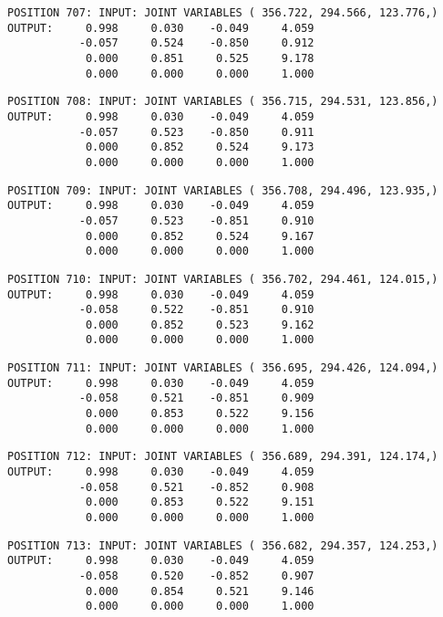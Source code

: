 \begin{verbatim}
POSITION 707: INPUT: JOINT VARIABLES ( 356.722, 294.566, 123.776,)
OUTPUT:     0.998     0.030    -0.049     4.059
           -0.057     0.524    -0.850     0.912
            0.000     0.851     0.525     9.178
            0.000     0.000     0.000     1.000
\end{verbatim} \pagebreak[1]\begin{verbatim}
POSITION 708: INPUT: JOINT VARIABLES ( 356.715, 294.531, 123.856,)
OUTPUT:     0.998     0.030    -0.049     4.059
           -0.057     0.523    -0.850     0.911
            0.000     0.852     0.524     9.173
            0.000     0.000     0.000     1.000
\end{verbatim} \pagebreak[1]\begin{verbatim}
POSITION 709: INPUT: JOINT VARIABLES ( 356.708, 294.496, 123.935,)
OUTPUT:     0.998     0.030    -0.049     4.059
           -0.057     0.523    -0.851     0.910
            0.000     0.852     0.524     9.167
            0.000     0.000     0.000     1.000
\end{verbatim} \pagebreak[1]\begin{verbatim}
POSITION 710: INPUT: JOINT VARIABLES ( 356.702, 294.461, 124.015,)
OUTPUT:     0.998     0.030    -0.049     4.059
           -0.058     0.522    -0.851     0.910
            0.000     0.852     0.523     9.162
            0.000     0.000     0.000     1.000
\end{verbatim} \pagebreak[1]\begin{verbatim}
POSITION 711: INPUT: JOINT VARIABLES ( 356.695, 294.426, 124.094,)
OUTPUT:     0.998     0.030    -0.049     4.059
           -0.058     0.521    -0.851     0.909
            0.000     0.853     0.522     9.156
            0.000     0.000     0.000     1.000
\end{verbatim} \pagebreak[1]\begin{verbatim}
POSITION 712: INPUT: JOINT VARIABLES ( 356.689, 294.391, 124.174,)
OUTPUT:     0.998     0.030    -0.049     4.059
           -0.058     0.521    -0.852     0.908
            0.000     0.853     0.522     9.151
            0.000     0.000     0.000     1.000
\end{verbatim} \pagebreak[1]\begin{verbatim}
POSITION 713: INPUT: JOINT VARIABLES ( 356.682, 294.357, 124.253,)
OUTPUT:     0.998     0.030    -0.049     4.059
           -0.058     0.520    -0.852     0.907
            0.000     0.854     0.521     9.146
            0.000     0.000     0.000     1.000
\end{verbatim} \pagebreak[1]\begin{verbatim}

\end{verbatim}
